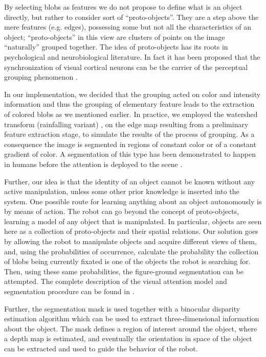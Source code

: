 By selecting blobs as features we do not propose to define what is an object directly, but rather to consider sort of ``proto-objects''. They are a step above the mere features (e.g. edges), possessing some but not all the characteristics of an object; ``proto-objects'' in this view are clusters of points on the image ``naturally'' grouped together. The idea of proto-objects has its roots in psychological \cite{pylyshyn01indexes} and neurobiological literature. In fact it has been proposed that the synchronization of visual cortical neurons can be the carrier of the perceptual grouping phenomenon \cite{eckhorn88coherent,gray89oscillatory}.

In our implementation, we decided that the grouping acted on color and intensity information and thus the grouping of elementary feature leads to the extraction of colored blobs as we mentioned earlier. In practice, we employed the watershed transform (rainfalling variant) \cite{smet00rainfalling}, on the edge map resulting from a preliminary feature extraction stage, to simulate the results of the process of grouping. As a consequence the image is segmented in regions of constant color or of a constant gradient of color. A segmentation of this type has been demonstrated to happen in humans before the attention is deployed to the scene \cite{driver00segmentation}.

Further, our idea is that the identity of an object cannot be known without any active manipulation, unless some other prior knowledge is inserted into the system. One possible route for learning anything about an object autonomously is by means of action. The robot can go beyond the concept of proto-objects, learning a model of any object that is manipulated. In particular, objects are seen here as a collection of proto-objects and their spatial relations. Our solution goes by allowing the robot to manipulate objects and acquire different views of them, and, using the probabilities of occurrence, calculate the probability the collection of blobs being currently fixated is one of the objects the robot is searching for. Then, using these same probabilities, the figure-ground segmentation can be attempted. The complete description of the visual attention model and segmentation procedure can be found in \cite{orabona05object}.

Further, the segmentation mask is used together with a binocular disparity estimation algorithm which can be used to extract three-dimensional information about the object. The mask defines a region of interest around the object, where a depth map is estimated, and eventually the orientation in space of the object can be extracted and used to guide the behavior of the robot.

